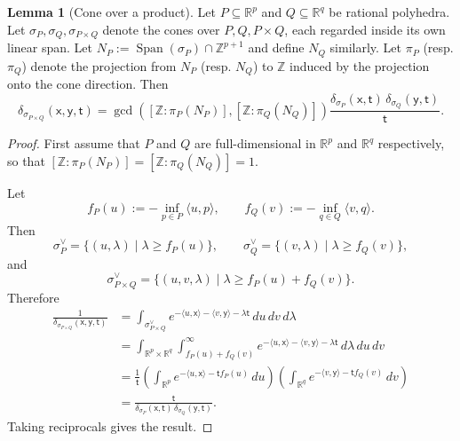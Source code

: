 \documentclass[11pt]{article}
\newcommand{\RR}{\mathbb{R}}
\DeclareMathOperator{\Span}{Span}
\theoremstyle{definition}
\newtheorem{lemma}[definition]{Lemma}
\begin{document}
\begin{lemma}[Cone over a product]
	\label{lem:cone-over-product}
	Let $P\subseteq \RR^p$ and $Q\subseteq \RR^q$ be rational polyhedra. Let $\sigma_P,\sigma_Q,\sigma_{P\times Q}$ denote the cones over $P,Q,P\times Q$, each regarded inside its own linear span. Let $N_P:=\Span(\sigma_P)\cap \mathbb{Z}^{p+1}$ and define $N_Q$ similarly. Let $\pi_P$ (resp. $\pi_Q$) denote the projection from $N_P$ (resp. $N_Q$) to $\mathbb{Z}$ induced by the projection onto the cone direction. Then
	\[
		\delta_{\sigma_{P\times Q}}(\mathsf{x},\mathsf{y},\mathsf{t})=\gcd([\mathbb{Z}:\pi_P(N_P)],[\mathbb{Z}:\pi_Q(N_Q)])\frac{\delta_{\sigma_P}(\mathsf{x},\mathsf{t})\,\delta_{\sigma_Q}(\mathsf{y},\mathsf{t})}{\mathsf{t}}.
	\]
\end{lemma}

\begin{proof}
	First assume that $P$ and $Q$ are full-dimensional in $\mathbb{R}^{p}$ and $\mathbb{R}^{q}$ respectively, so that $[\mathbb{Z}:\pi_P(N_P)]=[\mathbb{Z}:\pi_Q(N_Q)]=1$.

	Let
	\[
		f_P(u):=-\inf_{p\in P}\langle u,p\rangle,\qquad
		f_Q(v):=-\inf_{q\in Q}\langle v,q\rangle.
	\]
	Then
	\[
		\sigma_P^\vee=\{(u,\lambda)\mid \lambda\ge f_P(u)\},\qquad
		\sigma_Q^\vee=\{(v,\lambda)\mid \lambda\ge f_Q(v)\},
	\]
	and
	\[
		\sigma_{P\times Q}^\vee=\{(u,v,\lambda)\mid \lambda\ge f_P(u)+f_Q(v)\}.
	\]
	Therefore
	\begin{align*}
		\frac{1}{\delta_{\sigma_{P\times Q}}(\mathsf{x},\mathsf{y},\mathsf{t})}
	&=\int_{\sigma_{P\times Q}^\vee} e^{-\langle u,\mathsf{x}\rangle-\langle v,\mathsf{y}\rangle-\lambda \mathsf{t}}\,du\,dv\,d\lambda\\
	&=\int_{\RR^p\times \RR^q}\int_{f_P(u)+f_Q(v)}^\infty
	e^{-\langle u,\mathsf{x}\rangle-\langle v,\mathsf{y}\rangle-\lambda \mathsf{t}}\,d\lambda\,du\,dv\\
&=\frac1{\mathsf{t}}\left(\int_{\RR^p} e^{-\langle u,\mathsf{x}\rangle-\mathsf{t}f_P(u)}\,du\right)
\left(\int_{\RR^q} e^{-\langle v,\mathsf{y}\rangle-\mathsf{t}f_Q(v)}\,dv\right)\\
&=\frac{\mathsf{t}}{\delta_{\sigma_P}(\mathsf{x},\mathsf{t})\,\delta_{\sigma_Q}(\mathsf{y},\mathsf{t})}.
	\end{align*}
	Taking reciprocals gives the result.


\end{proof}
\end{document}
